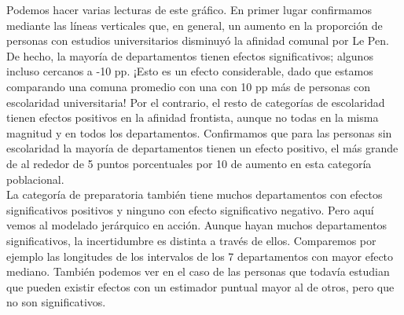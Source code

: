 Podemos hacer varias lecturas de este gráfico. En primer lugar confirmamos mediante las líneas verticales que, en general, un aumento en la proporción de personas con estudios universitarios disminuyó la afinidad comunal por Le Pen. De hecho, la mayoría de departamentos tienen efectos significativos; algunos incluso cercanos a -10 pp. ¡Esto es un efecto considerable, dado que estamos comparando una comuna promedio con una con 10 pp más de personas con escolaridad universitaria! Por el contrario, el resto de categorías de escolaridad tienen efectos positivos en la afinidad frontista, aunque no todas en la misma magnitud y en todos los departamentos. Confirmamos que para las personas sin escolaridad la mayoría de departamentos tienen un efecto positivo, el más grande de al rededor de 5 puntos porcentuales por 10 de aumento en esta categoría poblacional.\\ 

La categoría de preparatoria también tiene muchos departamentos con efectos significativos positivos y ninguno con efecto significativo negativo. Pero aquí vemos al modelado jerárquico en acción. Aunque hayan muchos departamentos significativos, la incertidumbre es distinta a través de ellos. Comparemos por ejemplo las longitudes de los intervalos de los 7 departamentos con mayor efecto mediano. También podemos ver en el caso de las personas que todavía estudian que pueden existir efectos con un estimador puntual mayor al de otros, pero que no son significativos.\\

